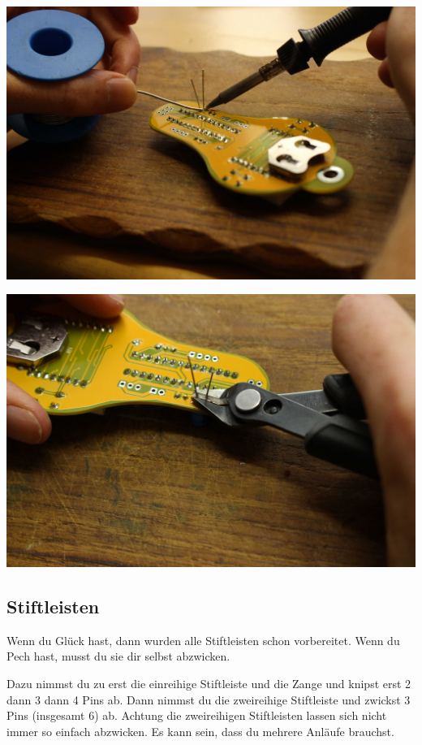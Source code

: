 \documentclass{article}
\begin{document}
\begin{minipage}[b]{0.5\textwidth}
	\includegraphics[width=\textwidth]{Bilder/IMG_5597.JPG}
	\label{fig:}
\end{minipage}
\begin{minipage}[b]{0.5\textwidth}
	\includegraphics[width=\textwidth]{Bilder/IMG_5600.JPG}
	\label{fig:}
\end{minipage}

\subsection{Stiftleisten}

Wenn du Glück hast, dann wurden alle Stiftleisten schon vorbereitet.
Wenn du Pech hast, musst du sie dir selbst abzwicken.

Dazu nimmst du zu erst die einreihige Stiftleiste und die Zange und knipst erst 2 dann 3 dann 4 Pins ab. Dann nimmst du die zweireihige Stiftleiste und zwickst 3 Pins (insgesamt 6) ab. Achtung die zweireihigen Stiftleisten lassen sich nicht immer so einfach abzwicken. Es kann sein, dass du mehrere Anläufe brauchst.
\end{document}
